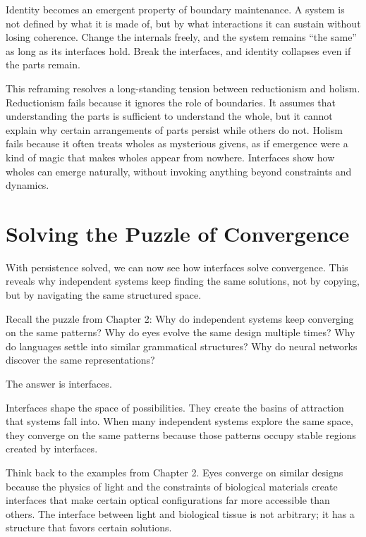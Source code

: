 \documentclass[
  openright]{book}
\begin{document}
Identity becomes an emergent property of boundary maintenance. A system
is not defined by what it is made of, but by what interactions it can
sustain without losing coherence. Change the internals freely, and the
system remains ``the same'' as long as its interfaces hold. Break the
interfaces, and identity collapses even if the parts remain.

This reframing resolves a long-standing tension between
reductionism and holism. Reductionism
fails because it ignores the role of boundaries. It assumes that
understanding the parts is sufficient to understand the whole, but it
cannot explain why certain arrangements of parts persist while others do
not. Holism fails because it often treats wholes as mysterious givens,
as if emergence were a kind of magic that makes wholes appear from
nowhere. Interfaces show how wholes can emerge naturally, without
invoking anything beyond constraints and dynamics.

\section{Solving the Puzzle of
Convergence}\label{solving-the-puzzle-of-convergence}

With persistence solved, we can now see how interfaces solve
convergence. This reveals why independent systems keep finding the same
solutions, not by copying, but by navigating the same structured space.

Recall the puzzle from Chapter 2: Why do independent systems keep
converging on the same patterns? Why do eyes evolve the same design
multiple times? Why do languages settle into similar grammatical
structures? Why do neural networks discover the same representations?

The answer is interfaces.

Interfaces shape the space of possibilities. They create the basins of
attraction that systems fall into. When many independent systems explore
the same space, they converge on the same patterns because those
patterns occupy stable regions created by interfaces.

Think back to the examples from Chapter 2. Eyes converge on similar
designs because the physics of light and the constraints of biological
materials create interfaces that make certain optical configurations far
more accessible than others. The interface between light and biological
tissue is not arbitrary; it has a structure that favors certain
solutions.
\end{document}
